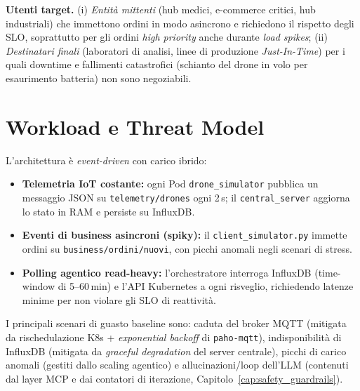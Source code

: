 \textbf{Utenti target.} (i) \textit{Entità mittenti} (hub medici, e-commerce critici, hub industriali) che immettono ordini in modo asincrono e richiedono il rispetto degli SLO, soprattutto per gli ordini \textit{high priority} anche durante \textit{load spikes}; (ii) \textit{Destinatari finali} (laboratori di analisi, linee di produzione \textit{Just-In-Time}) per i quali downtime e fallimenti catastrofici (schianto del drone in volo per esaurimento batteria) non sono negoziabili.

\section{Workload e Threat Model}
\label{sec:workload_threat}

L'architettura è \textit{event-driven} con carico ibrido:
\begin{itemize}
    \item \textbf{Telemetria IoT costante:} ogni Pod \texttt{drone\_simulator} pubblica un messaggio JSON su \texttt{telemetry/drones} ogni 2\,s; il \texttt{central\_server} aggiorna lo stato in RAM e persiste su InfluxDB.
    \item \textbf{Eventi di business asincroni (spiky):} il \texttt{client\_simulator.py} immette ordini su \texttt{business/ordini/nuovi}, con picchi anomali negli scenari di stress.
    \item \textbf{Polling agentico read-heavy:} l'orchestratore interroga InfluxDB (time-window di 5--60\,min) e l'API Kubernetes a ogni risveglio, richiedendo latenze minime per non violare gli SLO di reattività.
\end{itemize}

I principali scenari di guasto baseline sono: caduta del broker MQTT (mitigata da rischedulazione K8s + \textit{exponential backoff} di \texttt{paho-mqtt}), indisponibilità di InfluxDB (mitigata da \textit{graceful degradation} del server centrale), picchi di carico anomali (gestiti dallo scaling agentico) e allucinazioni/loop dell'LLM (contenuti dal layer MCP e dai contatori di iterazione, Capitolo~\ref{cap:safety_guardrails}).
